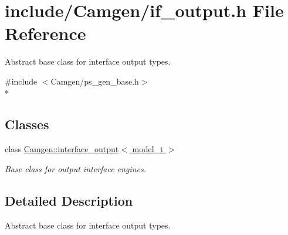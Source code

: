 \hypertarget{a00648}{\section{include/\-Camgen/if\-\_\-output.h File Reference}
\label{a00648}
}


Abstract base class for interface output types.  


{\ttfamily \#include $<$Camgen/ps\-\_\-gen\-\_\-base.\-h$>$}\\*
\subsection*{Classes}
\begin{DoxyCompactItemize}
\item 
class \hyperlink{a00315}{Camgen\-::interface\-\_\-output$<$ model\-\_\-t $>$}
\begin{DoxyCompactList}\small\item\em Base class for output interface engines. \end{DoxyCompactList}\end{DoxyCompactItemize}


\subsection{Detailed Description}
Abstract base class for interface output types. 